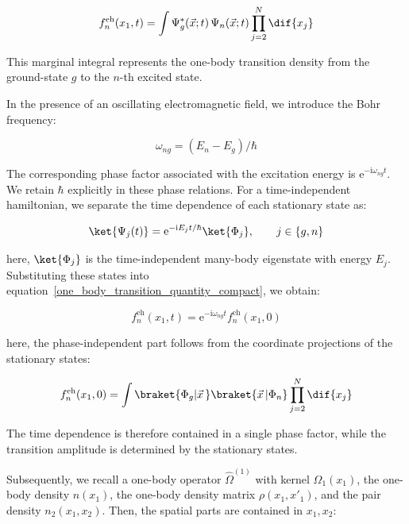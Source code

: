 \begin{equation}
f_n^\mathrm{eh}(x_1,t)=\int\Psi_g^*(\vec{x};t)\,\Psi_n(\vec{x};t)\prod^N_{j=2}\dif{x_j}
\label{one_body_transition_quantity_compact}
\end{equation}

This marginal integral represents the one-body transition density from the ground-state $g$ to the $n$-th excited state.

In the presence of an oscillating electromagnetic field, we introduce the Bohr frequency:

\begin{equation}
\omega_{ng}=(E_n-E_g)/\hbar
\label{Bohr_frequency}
\end{equation}

The corresponding phase factor associated with the excitation energy is $\mathrm{e}^{-\mathrm{i}\omega_{ng}t}$.
We retain $\hbar$ explicitly in these phase relations.
For a time-independent hamiltonian, we separate the time dependence of each stationary state as:

\begin{equation}
    \ket{\Psi_j(t)}=\mathrm{e}^{-\mathrm{i}E_jt/\hbar}\ket{\Phi_j},
    \qquad j\in\{g,n\}
\label{time_dep_eigenstate}
\end{equation}

here, $\ket{\Phi_j}$ is the time-independent many-body eigenstate with energy $E_j$.
Substituting these states into equation~\eqref{one_body_transition_quantity_compact},
we obtain:

\begin{equation}
    f_n^\mathrm{eh}(x_1,t)
    =\mathrm{e}^{-\mathrm{i}\omega_{ng}t}f_n^\mathrm{eh}(x_1,0)
\label{mod_transition_one-body}
\end{equation}

here, the phase-independent part follows from the coordinate projections of the stationary states:

\begin{equation}
    f_n^\mathrm{eh}(x_1,0)
    =\int\braket{\Phi_g|\vec{x}\,}\braket{\vec{x}\,|\Phi_n}
    \prod_{j=2}^{N}\dif{x_j}
\label{transition_amplitude}
\end{equation}

The time dependence is therefore contained in a single phase factor,
while the transition amplitude is determined by the stationary states.

Subsequently, we recall a one-body operator $\hat{\Omega}^{(1)}$ with kernel $\Omega_1(x_1)$,
the one-body density $n(x_1)$,
the one-body density matrix $\rho(x_1,x'_1)$,
and the pair density $n_2(x_1,x_2)$.
Then, the spatial parts are contained in $x_1,x_2$:

